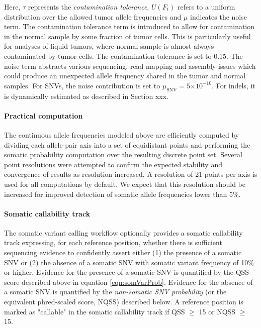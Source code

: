 \documentclass{article}
\newcommand{\e}[1]{\ensuremath{\times 10^{#1}}}
\begin{document}
\noindent Here, $\tau$ represents the {\em contamination tolerance}, $U(F_t)$ refers to a uniform distribution over the allowed tumor allele frequencies and $\mu$ indicates the noise term. The contamination tolerance term is introduced to allow for contamination in the normal sample by some fraction of tumor cells. This is particularly useful for analyses of liquid tumors, where normal sample is almost always contaminated by tumor cells. The contamination tolerance is set to $0.15$. The noise term abstracts various sequencing, read mapping and assembly issues which could produce an unexpected allele frequency shared in the tumor and normal samples. For SNVs, the noise contribution is set to $\mu_{\text{SNV}} = 5\e{-10}$. For indels, it is dynamically estimated as described in Section xxx.


\paragraph{Practical computation}

The continuous allele frequencies modeled above are efficiently computed by dividing each allele-pair axis into a set of equidistant points and performing the somatic probability computation over the resulting discrete point set. Several point resolutions were attempted to confirm the expected stability and convergence of results as resolution increased. A resolution of 21 points per axis is used for all computations by default. We expect that this resolution should be increased for improved detection of somatic allele frequencies lower than 5\%.

\paragraph{Somatic callability track}

The somatic variant calling workflow optionally provides a somatic callability track expressing, for each reference position, whether there is sufficient sequencing evidence to confidently assert either (1) the presence of a somatic SNV or (2) the absence of a somatic SNV with somatic variant frequency of 10\% or higher. Evidence for the presence of a somatic SNV is quantified by the QSS score described above in equation \ref{eqn:somVarProb}. Evidence for the absence of a somatic SNV is quantified by the \emph{non-somatic SNV probability} (or the equivalent phred-scaled score, NQSS) described below. A reference position is marked as "callable" in the somatic callability track if QSS $\ge$ 15 or NQSS $\ge$ 15.
\end{document}
